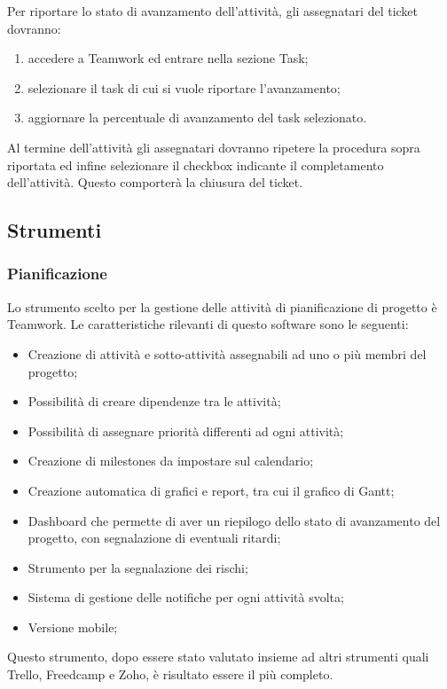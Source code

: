 \documentclass[../NormeProgetto.tex]{subfiles}
\begin{document}
			Per riportare lo stato di avanzamento dell'attività, gli assegnatari del ticket dovranno:
			\begin{enumerate}
				\item accedere a Teamwork ed entrare nella sezione Task;
				\item selezionare il task di cui si vuole riportare l'avanzamento;
				\item aggiornare la percentuale di avanzamento del task selezionato.
			\end{enumerate}
			Al termine dell'attività gli assegnatari dovranno ripetere la procedura sopra riportata ed infine selezionare il checkbox indicante il completamento dell'attività. Questo comporterà la chiusura del ticket.
	\subsection{Strumenti}
			
			\subsubsection{Pianificazione} \label{sec: Pianificazione Teamwork}
			Lo strumento scelto per la gestione delle attività di pianificazione di progetto è Teamwork. Le caratteristiche rilevanti di questo software sono le seguenti:
			\begin{itemize}
			\item Creazione di attività e sotto-attività assegnabili ad uno o più membri del progetto;
			\item Possibilità di creare dipendenze tra le attività;
			\item Possibilità di assegnare priorità differenti ad ogni attività;
			\item Creazione di milestones da impostare sul calendario;
			\item Creazione automatica di grafici e report, tra cui il grafico di Gantt;
			\item Dashboard che permette di aver un riepilogo dello stato di avanzamento del progetto, con segnalazione di eventuali ritardi;
			\item Strumento per la segnalazione dei rischi;
			\item Sistema di gestione delle notifiche per ogni attività svolta;
			\item Versione mobile;
			\end{itemize}		 
	Questo strumento, dopo essere stato valutato insieme ad altri strumenti quali Trello, Freedcamp e Zoho, è risultato essere il più completo.
			
\end{document}
